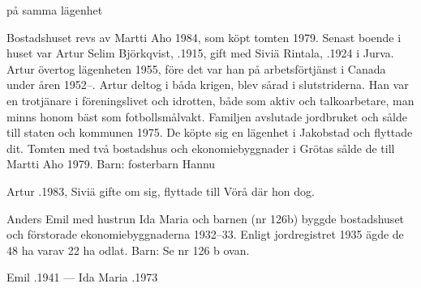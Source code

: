  på samma lägenhet



Bostadshuset revs av Martti Aho 1984, som köpt tomten 1979. Senast boende i huset var Artur Selim Björkqvist, .1915, gift med Siviä Rintala, .1924 i Jurva. Artur övertog lägenheten 1955, före det var han på arbetsförtjänst i Canada under åren 1952--. Artur deltog i båda krigen, blev sårad i slutstriderna.  Han var  en trotjänare i föreningslivet och idrotten, både som aktiv och talkoarbetare, man minns honom bäst som fotbollsmålvakt.  Familjen avslutade jordbruket och sålde till staten och kommunen 1975. De köpte sig en lägenhet i Jakobstad och flyttade dit. Tomten med två bostadshus och ekonomiebyggnader i Grötas sålde de till Martti Aho 1979.
Barn: fosterbarn Hannu

Artur .1983, Siviä gifte om sig, flyttade till Vörå där hon dog.


Anders Emil med hustrun Ida Maria och barnen (nr 126b) byggde bostadshuset och förstorade ekonomiebyggnaderna 1932--33. Enligt jordregistret 1935 ägde de 48 ha varav 22 ha odlat.
Barn: Se nr 126 b ovan.

Emil .1941  ---  Ida Maria .1973






